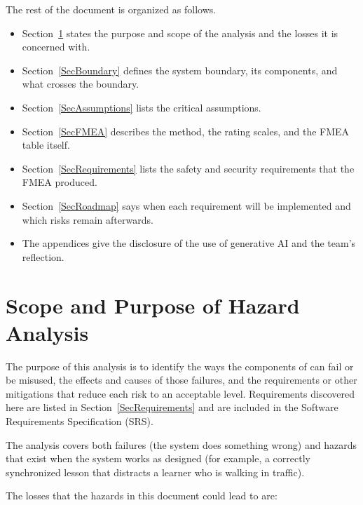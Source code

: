 \documentclass{article}
\begin{document}
The rest of the document is organized as follows.
\begin{itemize}
  \item Section~\ref{SecScope} states the purpose and scope of the analysis
        and the losses it is concerned with.
  \item Section~\ref{SecBoundary} defines the system boundary, its components,
        and what crosses the boundary.
  \item Section~\ref{SecAssumptions} lists the critical assumptions.
  \item Section~\ref{SecFMEA} describes the method, the rating scales, and
        the FMEA table itself.
  \item Section~\ref{SecRequirements} lists the safety and security
        requirements that the FMEA produced.
  \item Section~\ref{SecRoadmap} says when each requirement will be
        implemented and which risks remain afterwards.
  \item The appendices give the disclosure of the use of generative AI and
        the team's reflection.
\end{itemize}

\section{Scope and Purpose of Hazard Analysis} \label{SecScope}

The purpose of this analysis is to identify the ways the components of
\progname{} can fail or be misused, the effects and causes of those failures,
and the requirements or other mitigations that reduce each risk to an
acceptable level. Requirements discovered here are listed in
Section~\ref{SecRequirements} and are included in the Software Requirements
Specification (SRS).

The analysis covers both failures (the system does something wrong) and hazards
that exist when the system works as designed (for example, a correctly
synchronized lesson that distracts a learner who is walking in traffic).

The losses that the hazards in this document could lead to are:
\end{document}
